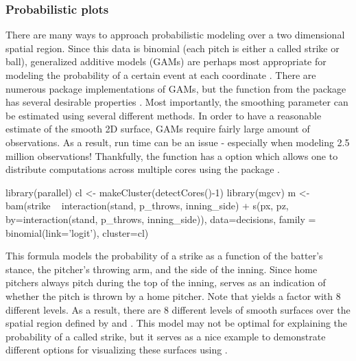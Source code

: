 \begin{article}
\subsubsection{Probabilistic plots}

There are many ways to approach probabilistic modeling over a two
dimensional spatial region. Since this data is binomial (each pitch
is either a called strike or ball), generalized additive models (GAMs)
are perhaps most appropriate for modeling the probability of a certain
event at each coordinate \citet{loess}. There are numerous 
package implementations of GAMs, but the  function from
the  package has several desirable properties \citet{mgcv}.
Most importantly, the smoothing parameter can be estimated using several
different methods. In order to have a reasonable estimate of the smooth
2D surface, GAMs require fairly large amount of observations. As a
result, run time can be an issue - especially when modeling 2.5 million
observations! Thankfully, the  function has a 
option which allows one to distribute computations across multiple
cores using the  package \citet{R}.

\begin{Schunk}
\begin{Sinput}
library(parallel) 
cl <- makeCluster(detectCores()-1)
library(mgcv) 
m <- bam(strike ~ interaction(stand, p_throws, inning_side) +                
			s(px, pz, by=interaction(stand, p_throws, inning_side)),              
			data=decisions, family = binomial(link='logit'), cluster=cl)
\end{Sinput}
\end{Schunk}


This formula models the probability of a strike as a function of the
batter's stance, the pitcher's throwing arm, and the side of the inning.
Since home pitchers always pitch during the top of the inning, 
serves as an indication of whether the pitch is thrown by a home pitcher.
Note that  yields
a factor with 8 different levels. As a result, there are 8 different
levels of smooth surfaces over the spatial region defined by 
and . This model may not be optimal for explaining the probability
of a called strike, but it serves as a nice example to demonstrate
different options for visualizing these surfaces using . 


\end{article}
